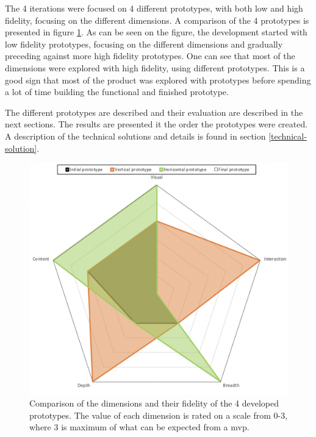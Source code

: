 \documentclass{report}
\begin{document}
The 4 iterations were focused on 4 different prototypes, with both low and high fidelity, focusing on the different dimensions. A comparison of the 4 prototypes is presented in figure \ref{fig:radar-chart}. As can be seen on the figure, the development started with low fidelity prototypes, focusing on the different dimensions and gradually preceding against more high fidelity prototypes. One can see that most of the dimensions were explored with high fidelity, using different prototypes. This is a good sign that most of the product was explored with prototypes before spending a lot of time building the functional and finished prototype. 

The different prototypes are described and their evaluation are described in the next sections. The results are presented it the order the prototypes were created. A description of the technical solutions and details is found in section \ref{technical-solution}.

\begin{figure}[h!]
    \centering
    \includegraphics[width=\linewidth]{../images/radar-chart.png}
    \caption{Comparison of the dimensions and their fidelity of the 4 developed prototypes. The value of each dimension is rated on a scale from 0-3, where 3 is maximum of what can be expected from a \gls{mvp}.}
    \label{fig:radar-chart}
\end{figure}


\end{document}
